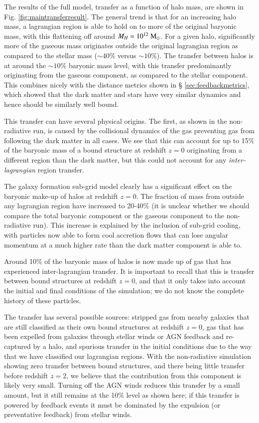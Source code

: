 The results of the full model, transfer as a function of halo mass, are shown
in Fig. \ref{fig:maintransferresult}. The general trend is that for an
increasing halo mass, a lagrangian region is able to hold on to more of the
original baryonic mass, with this flattening off around $M_H = 10^{12}
\;{\rm M}_{\odot}$. For a given halo, significantly more of the gaseous mass originates
outside the original lagrangian region as compared to the stellar mass ($\sim
40 \%$ versus $\sim 10 \%$). The transfer between halos is at around the
$\sim 10\%$ baryonic mass level, with this transfer predominantly
originating from the gaseous component, as compared to the stellar component.
This combines nicely with the distance metrics shown in \S
\ref{sec:feedbackmetrics}, which showed that the dark matter and stars have
very similar dynamics and hence should be similarly well bound.

This transfer can have several physical origins. The first, as shown in the
non-radiative run, is caused by the collisional dynamics of the gas preventing
gas from following the dark matter in all cases. We see that this can account
for up to 15\% of the baryonic mass of a bound structure at redshift $z=0$ originating
from a different region than the dark matter, but this could not account for any
\emph{inter-lagrangian} region transfer.

The galaxy formation sub-grid model clearly has a significant effect on the 
baryonic make-up of halos at redshift $z=0$. The fraction of mass from outside
any lagrangian region have increased to 20-40\% (it is unclear whether we should
compare the total baryonic component or the gaseous component to the non-radiative
run). This increase is explained by the inclusion of sub-grid cooling, with particles
now able to form cool accretion flows that can lose angular momentum at a much higher
rate than the dark matter component is able to.

Around 10\% of the baryonic mass of halos is now made up of gas that has
experienced inter-lagrangian transfer. It is important to recall that this is transfer
between bound structures at redshift $z=0$, and that it only takes into account
the initial and final conditions of the simulation; we do not know the complete history
of these particles.


The transfer has several possible sources: stripped gas from nearby galaxies that are
still classified as their own bound structures at redshift $z=0$, gas that has 
been expelled from galaxies through stellar winds or AGN feedback and re-captured
by a halo, and spurious transfer in the initial conditions due to the way that
we have classified our lagrangian regions. With the non-radiative simulation
showing zero transfer between bound structures, and there being little transfer
before redshift $z=2$, we believe that the contribution from this component is
likely very small. Turning off the AGN winds reduces this transfer by a small amount,
but it still remains at the 10\% level as shown here; if this transfer
is powered by feedback events it must be dominated by the expulsion
(or preventative feedback) from stellar winds.

